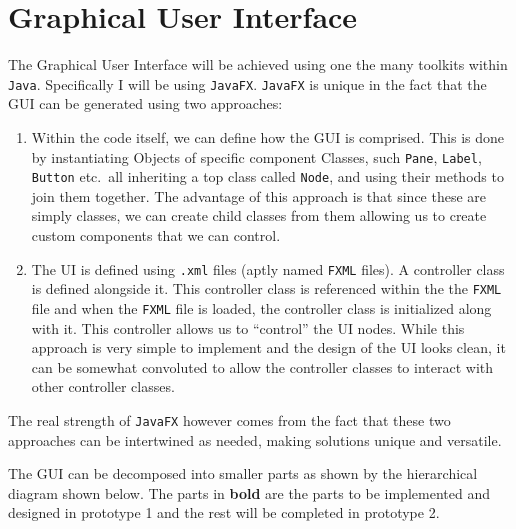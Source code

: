 \documentclass[../../../../main.tex]{subfiles}
\begin{document}
\section{Graphical User Interface}
The Graphical User Interface will be achieved using one the many toolkits within \texttt{Java}. Specifically I will be using \texttt{JavaFX\cite{javafx}}. \texttt{JavaFX} is unique in the fact that the GUI can be generated using two approaches:
\begin{enumerate}
\item Within the code itself, we can define how the GUI\cite{javafxEx} is comprised. This is done by instantiating Objects of specific component Classes, such \texttt{Pane}, \texttt{Label}, \texttt{Button} etc.\ all inheriting a top class called \texttt{Node}, and using their methods to join them together. The advantage of this approach is that since these are simply classes, we can create child classes from them allowing us to create custom components that we can control.
\item The UI is defined using \texttt{.xml} files (aptly named \texttt{FXML\cite{fxml}} files). A controller class is defined alongside it. This controller class is referenced within the the \texttt{FXML} file and when the \texttt{FXML} file is loaded, the controller class is initialized along with it. This controller allows us to ``control'' the UI nodes. While this approach is very simple to implement and the design of the UI looks clean, it can be somewhat convoluted to allow the controller classes to interact with other controller classes.
\end{enumerate}
The real strength of \texttt{JavaFX} however comes from the fact that these two approaches can be intertwined as needed, making solutions unique and versatile. 

The GUI can be decomposed into smaller parts as shown by the hierarchical diagram shown below. The parts in \textbf{bold} are the parts to be implemented and designed in prototype 1 and the rest will be completed in prototype 2.
\end{document}
